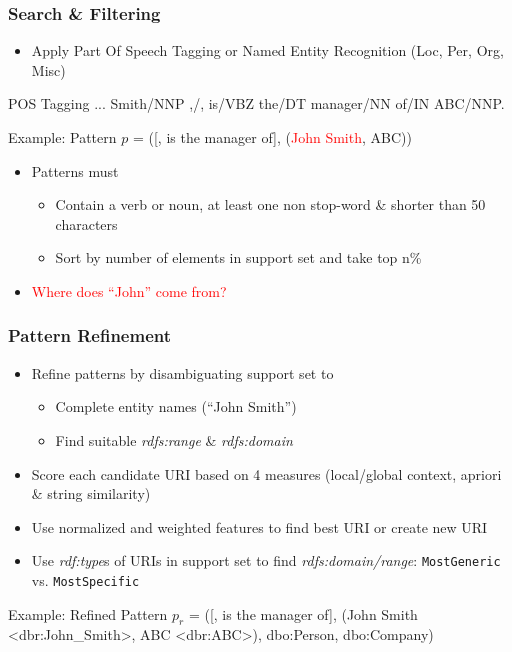 \documentclass{beamer}
\begin{document}
\begin{frame}
    \frametitle{Search \& Filtering}
    \begin{itemize}
        \item Apply Part Of Speech Tagging or Named Entity Recognition (Loc, Per, Org, Misc)
    \end{itemize}
    \begin{block}{POS Tagging}
        ... Smith/NNP ,/, is/VBZ the/DT manager/NN of/IN ABC/NNP.
    \end{block}
\pause
    \begin{block}{Example: Pattern}
        $p$ = ([, is the manager of], {(\textcolor{red}{John Smith}, ABC)})
    \end{block}
    \begin{itemize}
\item Patterns must
\begin{itemize}
        \item Contain a verb or noun, at least one non stop-word \& shorter than 50 characters
        \item Sort by number of elements in support set and take top n\%
    \end{itemize}
\item \textcolor{red}{Where does ``John'' come from?}
\end{itemize}
\end{frame}


\begin{frame}
    \frametitle{Pattern Refinement}

    \begin{itemize}
        \item Refine patterns by disambiguating support set to 
\begin{itemize}
        \item Complete entity names (``John Smith'')
\item Find suitable \textit{rdfs:range} \& \textit{rdfs:domain}
\end{itemize}
        \item Score each candidate URI based on 4 measures (local/global context, apriori \& string similarity)
        \item Use normalized and weighted features to find best URI or create new URI
        \item Use \textit{rdf:type}s of URIs in support set to find \textit{rdfs:domain/range}: \texttt{MostGeneric} vs. \texttt{MostSpecific}
    \end{itemize}
    \begin{block}{Example: Refined Pattern}
        $p_r$ = ([, is the manager of], {(John Smith \textless dbr:John\_Smith\textgreater, ABC \textless dbr:ABC\textgreater)}, dbo:Person, dbo:Company)
    \end{block}
\end{frame}
\end{document}
